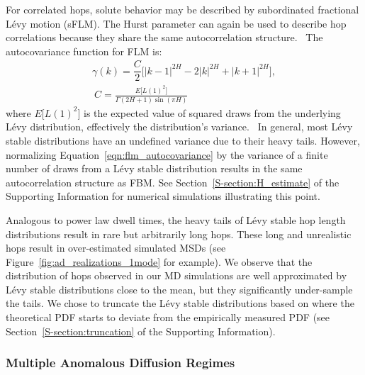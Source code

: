 \documentclass[journal=ancac3,manuscript=article,layout=twocolumn]{achemso}
\begin{document}
  For correlated hops, solute behavior may be described by subordinated
  fractional L\'evy motion (sFLM). The Hurst parameter can again be used to
  describe hop correlations because they share the same autocorrelation
  structure.~\cite{tikanmaki_fractional_2010} The autocovariance function for
  FLM is:
  \begin{equation}
  \begin{gathered}
    \gamma(k) = \dfrac{C}{2}\bigg[|k-1|^{2H} - 2|k|^{2H} + |k+1|^{2H}\bigg], \\
    ~C = \frac{E\big[L(1)^2\big]}{\Gamma(2H + 1)\sin(\pi H)}
  \end{gathered}
  \label{eqn:flm_autocovariance}
  \end{equation}
  where $E\big[L(1)^2\big]$ is the expected value of squared draws from the 
  underlying L\'evy distribution, effectively the distribution's 
  variance.~\cite{bishwal_maximum_2011} In general, most L\'evy stable distributions
  have an undefined variance due to their heavy tails. However, normalizing
  Equation~\ref{eqn:flm_autocovariance} by the variance of a finite number of draws
  from a L\'evy stable distribution results in the same autocorrelation structure as FBM.
  See Section~\ref{S-section:H_estimate} of the Supporting Information for numerical
  simulations illustrating this point.
  
  Analogous to power law dwell times, the heavy tails of L\'evy stable hop
  length distributions result in rare but arbitrarily long hops. These long and
  unrealistic hops result in over-estimated simulated MSDs (see
  Figure~\ref{fig:ad_realizations_1mode} for example). We observe that the
  distribution of hops observed in our MD simulations are well approximated by
  L\'evy stable distributions close to the mean, but they significantly
  under-sample the tails. We chose to truncate the L\'evy stable distributions
  based on where the theoretical PDF starts
  to deviate from the empirically measured PDF (see
  Section~\ref{S-section:truncation} of the Supporting Information).~\cite{mantegna_stochastic_1994}

  \subsubsection*{Multiple Anomalous Diffusion Regimes}
  
\end{document}
